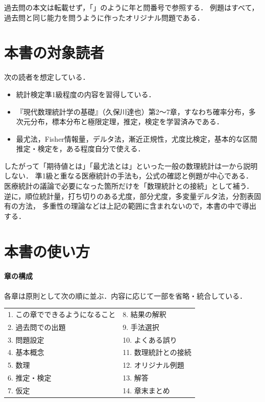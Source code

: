 過去問の本文は転載せず，「」のように年と問番号で参照する．
例題はすべて，過去問と同じ能力を問うように作ったオリジナル問題である．

\section*{本書の対象読者}
次の読者を想定している．
\begin{itemize}
\item 統計検定準1級程度の内容を習得している．
\item 『現代数理統計学の基礎』（久保川達也）第2〜7章，すなわち確率分布，多次元分布，標本分布と極限定理，推定，検定を学習済みである．
\item 最尤法，Fisher情報量，デルタ法，漸近正規性，尤度比検定，基本的な区間推定・検定を，ある程度自分で使える．
\end{itemize}
したがって「期待値とは」「最尤法とは」といった一般の数理統計は一から説明しない．
準1級と重なる医療統計の手法も，公式の確認と例題が中心である．
医療統計の議論で必要になった箇所だけを「数理統計との接続」として補う．
逆に，順位統計量，打ち切りのある尤度，部分尤度，多変量デルタ法，分割表固有の方法，
多重性の理論などは上記の範囲に含まれないので，本書の中で導出する．

\section*{本書の使い方}
\paragraph{章の構成}
各章は原則として次の順に並ぶ．内容に応じて一部を省略・統合している．
\begin{center}\small
\begin{tabular}{@{}ll@{}}
\toprule
1. この章でできるようになること & 8. 結果の解釈\\
2. 過去問での出題 & 9. 手法選択\\
3. 問題設定 & 10. よくある誤り\\
4. 基本概念 & 11. 数理統計との接続\\
5. 数理 & 12. オリジナル例題\\
6. 推定・検定 & 13. 解答\\
7. 仮定 & 14. 章末まとめ\\
\bottomrule
\end{tabular}
\end{center}

